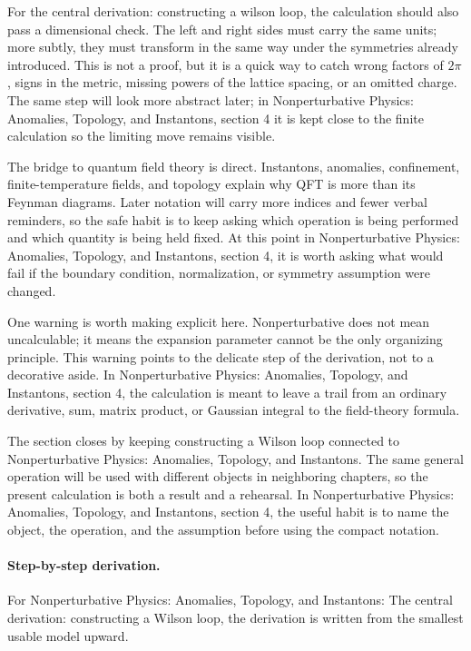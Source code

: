 For the central derivation: constructing a wilson loop, the calculation should also pass a dimensional check.  The left and right sides must carry the same units; more subtly, they must transform in the same way under the symmetries already introduced.  This is not a proof, but it is a quick way to catch wrong factors of \(2\pi\), signs in the metric, missing powers of the lattice spacing, or an omitted charge.  The same step will look more abstract later; in Nonperturbative Physics: Anomalies, Topology, and Instantons, section 4 it is kept close to the finite calculation so the limiting move remains visible.

The bridge to quantum field theory is direct.  Instantons, anomalies, confinement, finite-temperature fields, and topology explain why QFT is more than its Feynman diagrams.  Later notation will carry more indices and fewer verbal reminders, so the safe habit is to keep asking which operation is being performed and which quantity is being held fixed.  At this point in Nonperturbative Physics: Anomalies, Topology, and Instantons, section 4, it is worth asking what would fail if the boundary condition, normalization, or symmetry assumption were changed.

One warning is worth making explicit here.  Nonperturbative does not mean uncalculable; it means the expansion parameter cannot be the only organizing principle.  This warning points to the delicate step of the derivation, not to a decorative aside.  In Nonperturbative Physics: Anomalies, Topology, and Instantons, section 4, the calculation is meant to leave a trail from an ordinary derivative, sum, matrix product, or Gaussian integral to the field-theory formula.

The section closes by keeping constructing a Wilson loop connected to Nonperturbative Physics: Anomalies, Topology, and Instantons.  The same general operation will be used with different objects in neighboring chapters, so the present calculation is both a result and a rehearsal.  In Nonperturbative Physics: Anomalies, Topology, and Instantons, section 4, the useful habit is to name the object, the operation, and the assumption before using the compact notation.



\paragraph{Step-by-step derivation.}

For Nonperturbative Physics: Anomalies, Topology, and Instantons: The central derivation: constructing a Wilson loop, the derivation is written from the smallest usable model upward.


